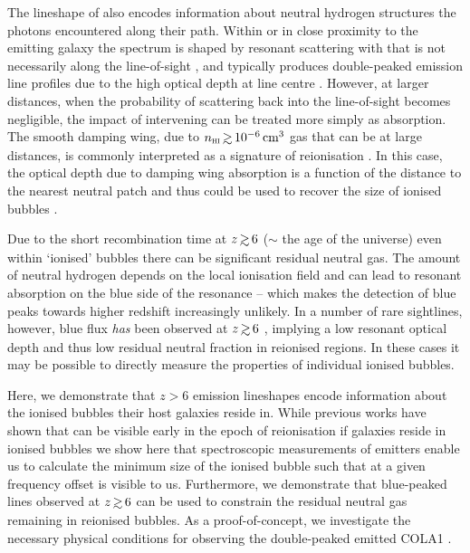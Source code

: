 \documentclass[fleqn,usenatbib]{mnras}
\begin{document}
The lineshape of \lya also encodes information about neutral hydrogen structures the photons encountered along their path. Within or in close proximity to the emitting galaxy the \lya spectrum is shaped by resonant scattering with \HI that is not necessarily along the line-of-sight \citep{Eide2018}, and typically produces double-peaked emission line profiles due to the high optical depth at line centre \citep[e.g.,][]{Neufeld1990}. However, at larger distances, when the probability of scattering back into the line-of-sight becomes negligible, the impact of intervening \HI can be treated more simply as absorption.
The smooth damping wing, due to $n_{\HI} \simgt 10^{-6} \cm^3$ gas that can be at large distances, is commonly interpreted as a signature of reionisation \citep[ e.g.,][]{Miralda-Escude1998}. In this case, the optical depth due to damping wing absorption is a function of the distance to the nearest neutral patch and thus could be used to recover the size of ionised bubbles \citep{Malhotra2006}. 

Due to the short recombination time at $z\simgt6$ ($\sim$ the age of the universe) even within `ionised' bubbles there can be significant residual neutral gas. The amount of neutral hydrogen  depends on the local ionisation field and can lead to resonant absorption on the blue side of the \lya resonance \citep[e.g.,][]{Gunn1965,Zheng2010,Laursen2011} -- which makes the detection of blue \lya peaks towards higher redshift increasingly unlikely. In a number of rare sightlines, however, blue \lya flux \textit{has} been observed at $z\simgt6$ \citep{Matthee2018b,Songaila2018,Bosman2019}, implying a low resonant optical depth and thus low residual neutral fraction in reionised regions. In these cases it may be possible to directly measure the properties of individual ionised bubbles.

Here, we demonstrate that $z>6$ \lya emission lineshapes encode information about the ionised bubbles their host galaxies reside in. While previous works have shown that \lya can be visible early in the epoch of reionisation if galaxies reside in ionised bubbles \citep{Haiman2002,Mason2018b} we show here that spectroscopic measurements of \lya emitters enable us to calculate the minimum size of the ionised bubble such that \lya at a given frequency offset is visible to us. 
Furthermore, we demonstrate that blue-peaked \lya lines observed at $z\simgt6$ can be used to constrain the residual neutral gas remaining in reionised bubbles. As a proof-of-concept, we investigate the necessary physical conditions for observing the double-peaked \lya emitted COLA1 \citep{Hu2016,Matthee2018b}.
\end{document}
